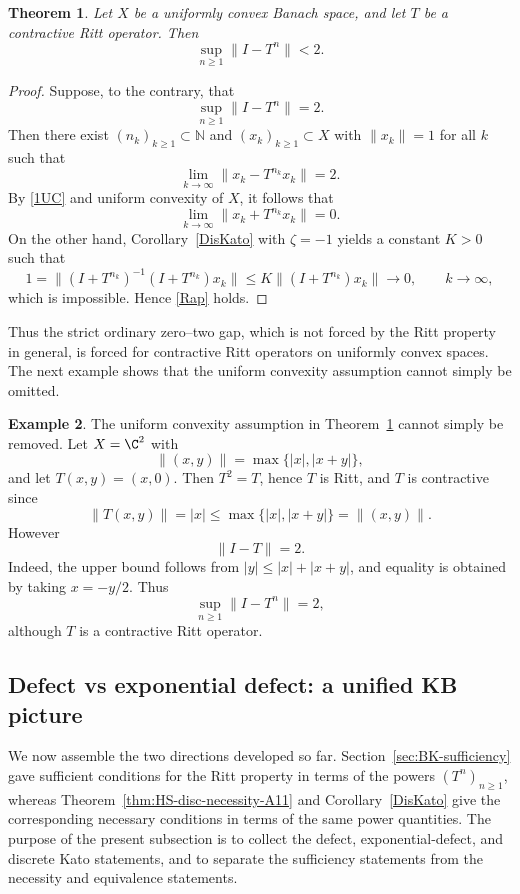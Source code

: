 \documentclass[11pt]{amsart}
\numberwithin{equation}{section}
\newtheorem{theorem}{Theorem}[section]
\theoremstyle{definition}
\newtheorem{example}[theorem]{Example}
\theoremstyle{plain}
\begin{document}
\begin{theorem}\label{Pazy}
Let $X$ be a uniformly convex Banach space, and let $T$ be a contractive Ritt operator. Then
\begin{equation}\label{Rap}
\sup_{n\ge 1}\|I-T^n\|<2.
\end{equation}
\end{theorem}

\begin{proof}
Suppose, to the contrary, that
\[
        \sup_{n\ge1}\|I-T^n\|=2.
\]
Then there exist  $(n_k)_{k \ge 1}\subset \mathbb N$ and $(x_k)_{k \ge 1}\subset X$ with $\|x_k\|=1$ for all $k$ such that
\begin{equation}\label{1UC}
\lim_{k\to\infty}\|x_k-T^{n_k}x_k\|=2.
\end{equation}
By \eqref{1UC} and uniform convexity of $X$, it follows that
\[
\lim_{k\to\infty}\|x_k+T^{n_k}x_k\|=0.
\]
On the other hand, Corollary~\ref{DisKato} with $\zeta=-1$ yields a constant $K>0$ such that
\[
1=\|(I+T^{n_k})^{-1}(I+T^{n_k})x_k\|\le K\|(I+T^{n_k})x_k\|\to 0,\qquad k\to\infty,
\]
which is impossible. Hence \eqref{Rap} holds.
\end{proof}
Thus the strict ordinary zero--two gap, which is not forced by the Ritt
property in general, is forced for contractive Ritt operators on uniformly
convex spaces.  The next example shows that the uniform convexity assumption
cannot simply be omitted.
\begin{example}\label{ex:projection-non-UC}
The uniform convexity assumption in Theorem~\ref{Pazy} cannot simply be removed. Let
$X=\C^2$ with
\[
        \|(x,y)\|=\max\{|x|,|x+y|\},
\]
and let $T(x,y)=(x,0)$. Then $T^2=T$, hence $T$ is Ritt, and $T$ is contractive since
\[
        \|T(x,y)\|=|x|\le \max\{|x|,|x+y|\}=\|(x,y)\|.
\]
However
\[
        \|I-T\|=2.
\]
Indeed, the upper bound follows from $|y|\le |x|+|x+y|$, and equality is obtained by taking $x=-y/2$. Thus
\[
        \sup_{n\ge1}\|I-T^n\|=2,
\]
although $T$ is a contractive Ritt operator.
\end{example}



\subsection{Defect vs exponential defect: a unified KB picture}

We now assemble the two directions developed so far. Section~\ref{sec:BK-sufficiency}
gave sufficient conditions for the Ritt property in terms of the powers $(T^n)_{n \ge 1}$,
whereas Theorem~\ref{thm:HS-disc-necessity-A11} and Corollary~\ref{DisKato} give the corresponding necessary conditions in terms of the same power quantities. The purpose of the present subsection is
to collect the defect, exponential-defect, and discrete Kato statements, and to separate the
sufficiency statements from the necessity and equivalence statements.
\end{document}
